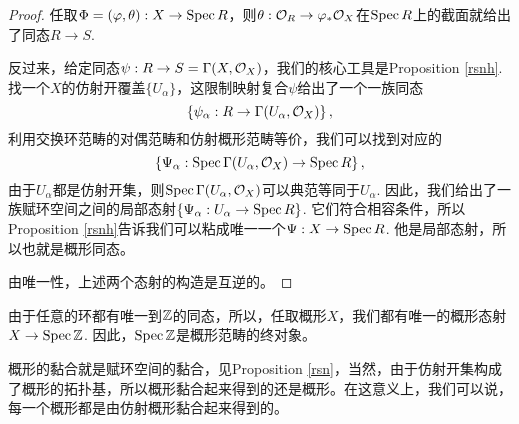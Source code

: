 \begin{proof}
	任取$\Phi=(\varphi,\theta):X\to \operatorname{Spec} R$，则$\theta:\mathcal{O}_R\to \varphi_*\mathcal{O}_X$在$\operatorname{Spec} R$上的截面就给出了同态$R\to S$.

	反过来，给定同态$\psi:R\to S=\Gamma(X,\mathcal{O}_X)$，我们的核心工具是Proposition \ref{rsnh}. 找一个$X$的仿射开覆盖$\{U_\alpha\}$，这限制映射复合$\psi$给出了一个一族同态
	\[
	\left\{\psi_\alpha:R\to \Gamma(U_\alpha,\mathcal{O}_X)\right\},
	\]
	利用交换环范畴的对偶范畴和仿射概形范畴等价，我们可以找到对应的
	\[
	\left\{\Psi_\alpha:\operatorname{Spec}\Gamma(U_\alpha,\mathcal{O}_X)\to \operatorname{Spec} R\right\},
	\]
	由于$U_\alpha$都是仿射开集，则$\operatorname{Spec}\Gamma(U_\alpha,\mathcal{O}_X)$可以典范等同于$U_\alpha$. 因此，我们给出了一族赋环空间之间的局部态射$\left\{\Psi_\alpha: U_\alpha \to \operatorname{Spec} R\right\}$. 它们符合相容条件，所以Proposition \ref{rsnh}告诉我们可以粘成唯一一个$\Psi:X\to \operatorname{Spec} R$. 他是局部态射，所以也就是概形同态。

	由唯一性，上述两个态射的构造是互逆的。
\end{proof}

由于任意的环都有唯一到$\mathbb{Z}$的同态，所以，任取概形$X$，我们都有唯一的概形态射$X\to \operatorname{Spec} \mathbb{Z}$. 因此，$\operatorname{Spec} \mathbb{Z}$是概形范畴的终对象。

\begin{para}[概形的黏合]
概形的黏合就是赋环空间的黏合，见Proposition \ref{rsn}，当然，由于仿射开集构成了概形的拓扑基，所以概形黏合起来得到的还是概形。在这意义上，我们可以说，每一个概形都是由仿射概形黏合起来得到的。
\end{para}

